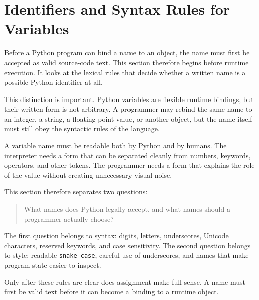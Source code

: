 \section{Identifiers and Syntax Rules for Variables}

Before a Python program can bind a name to an object, the name must first be accepted as valid source-code text. This section therefore begins before runtime execution. It looks at the lexical rules that decide whether a written name is a possible Python identifier at all.

This distinction is important. Python variables are flexible runtime bindings, but their written form is not arbitrary. A programmer may rebind the same name to an integer, a string, a floating-point value, or another object, but the name itself must still obey the syntactic rules of the language.

A variable name must be readable both by Python and by humans. The interpreter needs a form that can be separated cleanly from numbers, keywords, operators, and other tokens. The programmer needs a form that explains the role of the value without creating unnecessary visual noise.

This section therefore separates two questions:

\begin{quote}
What names does Python legally accept, and what names should a programmer actually choose?
\end{quote}

The first question belongs to syntax: digits, letters, underscores, Unicode characters, reserved keywords, and case sensitivity. The second question belongs to style: readable \texttt{snake\_case}, careful use of underscores, and names that make program state easier to inspect.

Only after these rules are clear does assignment make full sense. A name must first be valid text before it can become a binding to a runtime object.